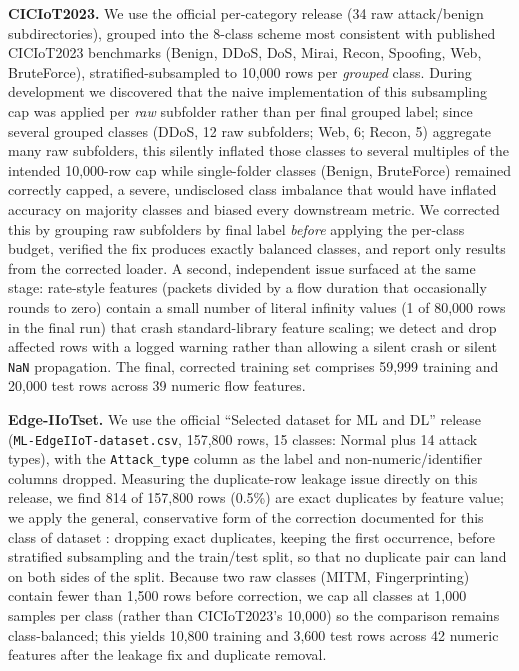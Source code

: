 \textbf{CICIoT2023.} We use the official per-category release (34 raw attack/benign subdirectories), grouped into the 8-class scheme most consistent with published CICIoT2023 benchmarks (Benign, DDoS, DoS, Mirai, Recon, Spoofing, Web, BruteForce), stratified-subsampled to 10,000 rows per \emph{grouped} class. During development we discovered that the naive implementation of this subsampling cap was applied per \emph{raw} subfolder rather than per final grouped label; since several grouped classes (DDoS, 12 raw subfolders; Web, 6; Recon, 5) aggregate many raw subfolders, this silently inflated those classes to several multiples of the intended 10,000-row cap while single-folder classes (Benign, BruteForce) remained correctly capped, a severe, undisclosed class imbalance that would have inflated accuracy on majority classes and biased every downstream metric. We corrected this by grouping raw subfolders by final label \emph{before} applying the per-class budget, verified the fix produces exactly balanced classes, and report only results from the corrected loader. A second, independent issue surfaced at the same stage: rate-style features (packets divided by a flow duration that occasionally rounds to zero) contain a small number of literal infinity values (1 of 80,000 rows in the final run) that crash standard-library feature scaling; we detect and drop affected rows with a logged warning rather than allowing a silent crash or silent \texttt{NaN} propagation. The final, corrected training set comprises 59,999 training and 20,000 test rows across 39 numeric flow features.

\textbf{Edge-IIoTset.} We use the official ``Selected dataset for ML and DL'' release (\texttt{ML-EdgeIIoT-dataset.csv}, 157,800 rows, 15 classes: Normal plus 14 attack types), with the \texttt{Attack\_type} column as the label and non-numeric/identifier columns dropped. Measuring the duplicate-row leakage issue directly on this release, we find 814 of 157,800 rows (0.5\%) are exact duplicates by feature value; we apply the general, conservative form of the correction documented for this class of dataset \citep{ref23}: dropping exact duplicates, keeping the first occurrence, before stratified subsampling and the train/test split, so that no duplicate pair can land on both sides of the split. Because two raw classes (MITM, Fingerprinting) contain fewer than 1,500 rows before correction, we cap all classes at 1,000 samples per class (rather than CICIoT2023's 10,000) so the comparison remains class-balanced; this yields 10,800 training and 3,600 test rows across 42 numeric features after the leakage fix and duplicate removal.


